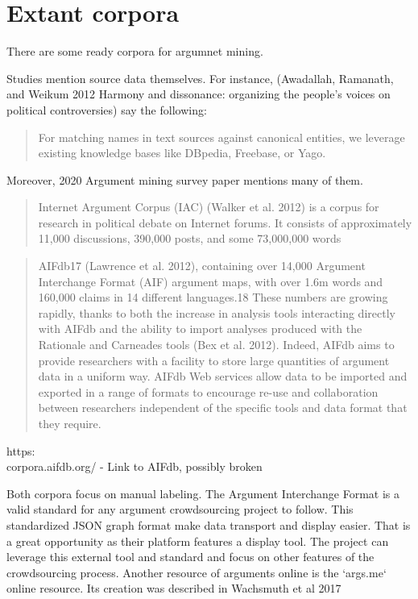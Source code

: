 \documentclass{report}
\begin{document}
{\section{Extant corpora}
There are some ready corpora for argumnet mining.

Studies mention source data themselves. 
For instance, (Awadallah, Ramanath, and Weikum 2012 Harmony and dissonance: organizing the people's voices on political controversies)
say the following:
\begin{quote}
 For matching names in text sources against canonical entities, we leverage existing knowledge bases like DBpedia, Freebase, or Yago.
\end{quote}

Moreover, 2020 Argument mining survey paper \cite{lawrence_argument_2020} mentions many of them.

\begin{quote}
 Internet Argument Corpus (IAC) (Walker et al. 2012) is a corpus for research in political debate on Internet forums. It consists of approximately 11,000 discussions, 390,000 posts, and some 73,000,000 words
\end{quote}
\begin{quote}
 AIFdb17 (Lawrence et al. 2012), containing over 14,000 Argument Interchange Format (AIF) argument maps, with over 1.6m words and 160,000 claims in 14 different languages.18 These numbers are growing rapidly, thanks to both the increase in analysis tools interacting directly with AIFdb and the ability to import analyses produced with the Rationale and Carneades tools (Bex et al. 2012). Indeed, AIFdb aims to provide researchers with a facility to store large quantities of argument data in a uniform way. AIFdb Web services allow data to be imported and exported in a range of formats to encourage re-use and collaboration between researchers independent of the specific tools and data format that they require.
\end{quote}
https:\\corpora.aifdb.org/ - Link to AIFdb, possibly broken

Both corpora focus on manual labeling.
The Argument Interchange Format is a valid standard for any argument crowdsourcing project to follow.  This standardized JSON graph format make data transport and display easier. That is a great opportunity as their platform features a display tool.  The project can leverage this external tool and standard and focus on other features of the crowdsourcing process.
Another resource of arguments online is the `args.me` online resource. 
Its creation was described in Wachsmuth et al 2017

}
\end{document}
